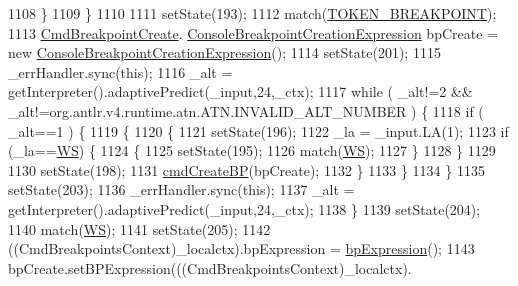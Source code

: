 \begin{DoxyCode}
1108           \}
1109         \}
1110 
1111         setState(193);
1112         match(\hyperlink{classgov_1_1nasa_1_1jpf_1_1inspector_1_1client_1_1parser_1_1_console_grammar_parser_a951264100f5521a2f0081d21d838a3ab}{TOKEN\_BREAKPOINT});
1113          \hyperlink{classgov_1_1nasa_1_1jpf_1_1inspector_1_1client_1_1commands_1_1_cmd_breakpoint_create}{CmdBreakpointCreate}.
      \hyperlink{classgov_1_1nasa_1_1jpf_1_1inspector_1_1client_1_1commands_1_1_cmd_breakpoint_create_1_1_console_breakpoint_creation_expression}{ConsoleBreakpointCreationExpression} bpCreate = \textcolor{keyword}{new} 
      \hyperlink{classgov_1_1nasa_1_1jpf_1_1inspector_1_1client_1_1commands_1_1_cmd_breakpoint_create_1_1_console_breakpoint_creation_expression}{ConsoleBreakpointCreationExpression}();
1114         setState(201);
1115         \_errHandler.sync(\textcolor{keyword}{this});
1116         \_alt = getInterpreter().adaptivePredict(\_input,24,\_ctx);
1117         \textcolor{keywordflow}{while} ( \_alt!=2 && \_alt!=org.antlr.v4.runtime.atn.ATN.INVALID\_ALT\_NUMBER ) \{
1118           \textcolor{keywordflow}{if} ( \_alt==1 ) \{
1119             \{
1120             \{
1121             setState(196);
1122             \_la = \_input.LA(1);
1123             \textcolor{keywordflow}{if} (\_la==\hyperlink{classgov_1_1nasa_1_1jpf_1_1inspector_1_1client_1_1parser_1_1_console_grammar_parser_a6914a3a3adbc350b12a7df9d1b24abf1}{WS}) \{
1124               \{
1125               setState(195);
1126               match(\hyperlink{classgov_1_1nasa_1_1jpf_1_1inspector_1_1client_1_1parser_1_1_console_grammar_parser_a6914a3a3adbc350b12a7df9d1b24abf1}{WS});
1127               \}
1128             \}
1129 
1130             setState(198);
1131             \hyperlink{classgov_1_1nasa_1_1jpf_1_1inspector_1_1client_1_1parser_1_1_console_grammar_parser_abe17248e2be8d9035749fc570f460e1b}{cmdCreateBP}(bpCreate);
1132             \}
1133             \} 
1134           \}
1135           setState(203);
1136           \_errHandler.sync(\textcolor{keyword}{this});
1137           \_alt = getInterpreter().adaptivePredict(\_input,24,\_ctx);
1138         \}
1139         setState(204);
1140         match(\hyperlink{classgov_1_1nasa_1_1jpf_1_1inspector_1_1client_1_1parser_1_1_console_grammar_parser_a6914a3a3adbc350b12a7df9d1b24abf1}{WS});
1141         setState(205);
1142         ((CmdBreakpointsContext)\_localctx).bpExpression = \hyperlink{classgov_1_1nasa_1_1jpf_1_1inspector_1_1client_1_1parser_1_1_console_grammar_parser_af8f413ff85d64783d9625af4ca4b1f06}{bpExpression}();
1143          bpCreate.setBPExpression(((CmdBreakpointsContext)\_localctx).

\end{DoxyCode}
